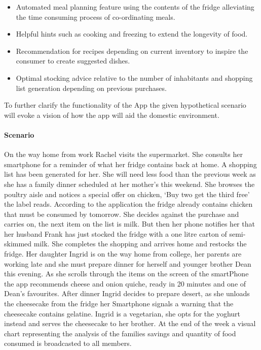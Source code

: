 \documentclass[a4paper, 11pt]{article}
\begin{document}
{\begin{itemize}
   \item Automated meal planning feature using the contents of the fridge alleviating the time consuming process of co-ordinating meals. 
    
   \item Helpful hints such as cooking and freezing to extend the longevity of food. 
   
   \item Recommendation for recipes depending on current inventory to inspire the consumer to create suggested dishes. 

   \item Optimal stocking advice relative to the number of inhabitants and shopping list generation depending on previous purchases. 
 \end{itemize}

To further clarify the functionality of the App the given hypothetical scenario will evoke a vision of how the app will aid the domestic environment. 

\paragraph{Scenario}On the way home from work Rachel visits the supermarket. She consults her smartphone for a reminder of what her fridge contains back at home. A shopping list has been generated for her. She will need less food than the previous week as she has a family dinner scheduled at her mother's this weekend. She browses the poultry aisle and notices a special offer on chicken, `Buy two get the third free' the label reads. According to the application the fridge already contains chicken that must be consumed by tomorrow. She decides against the purchase and carries on, the next item on the list is milk. But then her phone notifies her that her husband Frank has just stocked the fridge with a one litre carton of semi-skimmed milk. She completes the shopping and arrives home and restocks the fridge. Her daughter Ingrid is on the way home from college, her parents are working late and she must prepare dinner for herself and younger brother Dean this evening. As she scrolls through the items on the screen of the smartPhone the app recommends cheese and onion quiche, ready in 20 minutes and one of Dean's favourites. After dinner Ingrid decides to prepare desert, as she unloads the cheesecake from the fridge her Smartphone signals a warning that the cheesecake contains gelatine. Ingrid is a vegetarian, she opts for the yoghurt instead and serves the cheesecake to her brother. At the end of the week a visual chart representing the analysis of the families savings and quantity of food consumed is broadcasted to all members.

}
\end{document}

